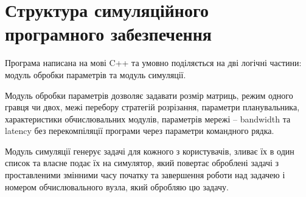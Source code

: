 
\section{Структура симуляційного програмного забезпечення}

Програма написана   на мові C++ та умовно поділяється на дві логічні частини: модуль обробки параметрів та модуль симуляції.

Модуль обробки параметрів дозволяє задавати розмір матриць, режим одного гравця чи двох, межі перебору стратегій розрізання, параметри планувальника, характеристики обчислювальних модулів, параметрів мережі – bandwidth та latency без перекомпіляції програми через параметри командного рядка.

Модуль симуляції генерує задачі для кожного з користувачів, зливає їх в один список та власне подає їх на симулятор, який повертає оброблені задачі з проставленими змінними часу початку та завершення роботи над задачею і номером обчислювального вузла, який обробляю цю  задачу.

